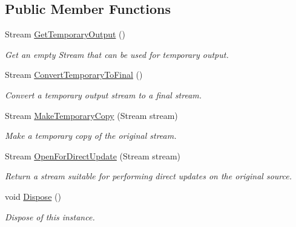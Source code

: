 \subsection*{Public Member Functions}
\begin{DoxyCompactItemize}
\item 
Stream \hyperlink{interface_i_c_sharp_code_1_1_sharp_zip_lib_1_1_zip_1_1_i_archive_storage_aa8c04ba6ece88eb03473135299de0a43}{Get\+Temporary\+Output} ()
\begin{DoxyCompactList}\small\item\em Get an empty Stream that can be used for temporary output. \end{DoxyCompactList}\item 
Stream \hyperlink{interface_i_c_sharp_code_1_1_sharp_zip_lib_1_1_zip_1_1_i_archive_storage_aa254436478256b7d33cf2739002346f5}{Convert\+Temporary\+To\+Final} ()
\begin{DoxyCompactList}\small\item\em Convert a temporary output stream to a final stream. \end{DoxyCompactList}\item 
Stream \hyperlink{interface_i_c_sharp_code_1_1_sharp_zip_lib_1_1_zip_1_1_i_archive_storage_a90dfbf17d7fd1a9ab9beb7a0b66b8678}{Make\+Temporary\+Copy} (Stream stream)
\begin{DoxyCompactList}\small\item\em Make a temporary copy of the original stream. \end{DoxyCompactList}\item 
Stream \hyperlink{interface_i_c_sharp_code_1_1_sharp_zip_lib_1_1_zip_1_1_i_archive_storage_aa7e4da76c28cd9e88342bd910de38fba}{Open\+For\+Direct\+Update} (Stream stream)
\begin{DoxyCompactList}\small\item\em Return a stream suitable for performing direct updates on the original source. \end{DoxyCompactList}\item 
void \hyperlink{interface_i_c_sharp_code_1_1_sharp_zip_lib_1_1_zip_1_1_i_archive_storage_ab0d4fb8b0557395851488846515ae64d}{Dispose} ()
\begin{DoxyCompactList}\small\item\em Dispose of this instance. \end{DoxyCompactList}\end{DoxyCompactItemize}
